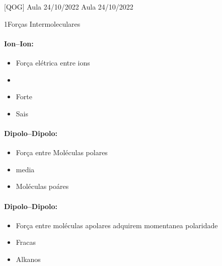 \documentclass[\mainfilename]{subfiles}
\begin{document}
[QOG]
{Aula 24/10/2022} %
{Aula 24/10/2022} %

\begin{sectionBox}1{Forças Intermoleculares} %

    \paragraph*{Ion--Ion:} 
    \begin{itemize}
        \item Força elétrica entre ions
        \item 
        \item Forte
        \item Sais
    \end{itemize}
    \paragraph*{Dipolo--Dipolo:} 
    \begin{itemize}
        \item Força entre Moléculas polares
        \item media
        \item Moléculas poáres
    \end{itemize}
    \paragraph*{Dipolo--Dipolo:}
    \begin{itemize}
        \item Força entre moléculas apolares adquirem momentanea polaridade
        \item Fracas
        \item Alkanos
    \end{itemize} 

\end{sectionBox}
\end{document}
